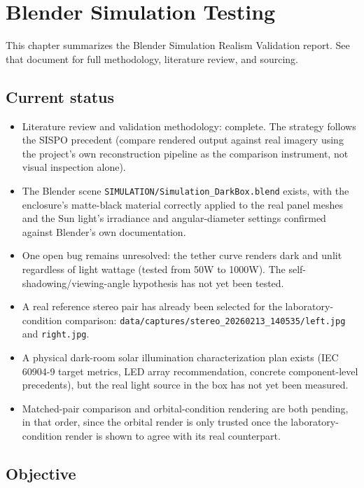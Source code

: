 \chapter{Blender Simulation Testing}
\label{chap:blender-simulation}

This chapter summarizes the Blender Simulation Realism Validation report. See that document for full methodology, literature review, and sourcing.

\section{Current status}

\begin{itemize}
    \item Literature review and validation methodology: complete. The strategy follows the SISPO precedent (compare rendered output against real imagery using the project's own reconstruction pipeline as the comparison instrument, not visual inspection alone).
    \item The Blender scene \texttt{SIMULATION/Simulation\_DarkBox.blend} exists, with the enclosure's matte-black material correctly applied to the real panel meshes and the Sun light's irradiance and angular-diameter settings confirmed against Blender's own documentation.
    \item One open bug remains unresolved: the tether curve renders dark and unlit regardless of light wattage (tested from 50W to 1000W). The self-shadowing/viewing-angle hypothesis has not yet been tested.
    \item A real reference stereo pair has already been selected for the laboratory-condition comparison: \texttt{data/captures/stereo\_20260213\_140535/left.jpg} and \texttt{right.jpg}.
    \item A physical dark-room solar illumination characterization plan exists (IEC 60904-9 target metrics, LED array recommendation, concrete component-level precedents), but the real light source in the box has not yet been measured.
    \item Matched-pair comparison and orbital-condition rendering are both pending, in that order, since the orbital render is only trusted once the laboratory-condition render is shown to agree with its real counterpart.
\end{itemize}

\section{Objective}

